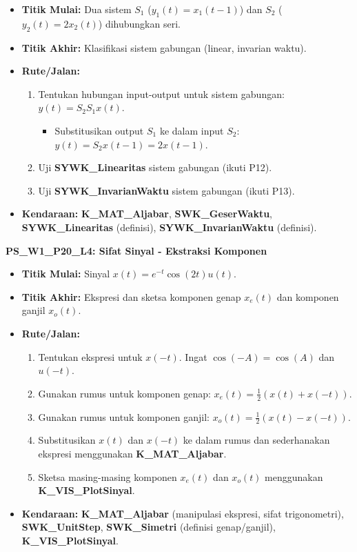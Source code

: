 \documentclass[
  letterpaper,
  DIV=11,
  numbers=noendperiod]{scrreprt}
\providecommand{\tightlist}{%
  \setlength{\itemsep}{0pt}\setlength{\parskip}{0pt}}\usepackage{longtable,booktabs,array}
\begin{document}
\begin{itemize}
\tightlist
\item
  \textbf{Titik Mulai:} Dua sistem \(S_1\) (\(y_1(t) = x_1(t-1)\)) dan
  \(S_2\) (\(y_2(t) = 2x_2(t)\)) dihubungkan seri.
\item
  \textbf{Titik Akhir:} Klasifikasi sistem gabungan (linear, invarian
  waktu).
\item
  \textbf{Rute/Jalan:}

  \begin{enumerate}
  \def\labelenumi{\arabic{enumi}.}
  \tightlist
  \item
    Tentukan hubungan input-output untuk sistem gabungan:
    \(y(t) = S_2{S_1{x(t)}}\).

    \begin{itemize}
    \tightlist
    \item
      Substitusikan output \(S_1\) ke dalam input \(S_2\):
      \(y(t) = S_2{x(t-1)} = 2x(t-1)\).
    \end{itemize}
  \item
    Uji \textbf{SYWK\_Linearitas} sistem gabungan (ikuti P12).
  \item
    Uji \textbf{SYWK\_InvarianWaktu} sistem gabungan (ikuti P13).
  \end{enumerate}
\item
  \textbf{Kendaraan:} \textbf{K\_MAT\_Aljabar},
  \textbf{SWK\_GeserWaktu}, \textbf{SYWK\_Linearitas} (definisi),
  \textbf{SYWK\_InvarianWaktu} (definisi).
\end{itemize}

\textbf{PS\_W1\_P20\_L4: Sifat Sinyal - Ekstraksi Komponen}

\begin{itemize}
\tightlist
\item
  \textbf{Titik Mulai:} Sinyal \(x(t) = e^{-t} \cos(2t) u(t)\).
\item
  \textbf{Titik Akhir:} Ekspresi dan sketsa komponen genap \(x_e(t)\)
  dan komponen ganjil \(x_o(t)\).
\item
  \textbf{Rute/Jalan:}

  \begin{enumerate}
  \def\labelenumi{\arabic{enumi}.}
  \tightlist
  \item
    Tentukan ekspresi untuk \(x(-t)\). Ingat \(\cos(-A) = \cos(A)\) dan
    \(u(-t)\).
  \item
    Gunakan rumus untuk komponen genap:
    \(x_e(t) = \frac{1}{2} (x(t) + x(-t))\).
  \item
    Gunakan rumus untuk komponen ganjil:
    \(x_o(t) = \frac{1}{2} (x(t) - x(-t))\).
  \item
    Substitusikan \(x(t)\) dan \(x(-t)\) ke dalam rumus dan sederhanakan
    ekspresi menggunakan \textbf{K\_MAT\_Aljabar}.
  \item
    Sketsa masing-masing komponen \(x_e(t)\) dan \(x_o(t)\) menggunakan
    \textbf{K\_VIS\_PlotSinyal}.
  \end{enumerate}
\item
  \textbf{Kendaraan:} \textbf{K\_MAT\_Aljabar} (manipulasi ekspresi,
  sifat trigonometri), \textbf{SWK\_UnitStep}, \textbf{SWK\_Simetri}
  (definisi genap/ganjil), \textbf{K\_VIS\_PlotSinyal}.
\end{itemize}
\end{document}
